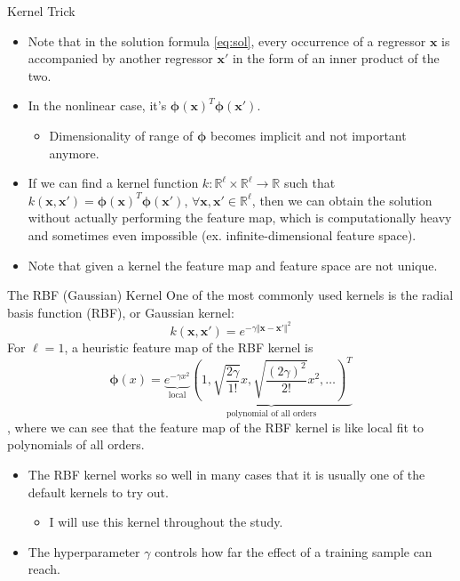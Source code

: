 \documentclass[aspectratio=169]{beamer}
\begin{document}
\begin{frame}{Kernel Trick}
\begin{itemize}
  \item Note that in the solution formula \ref{eq:sol}, every occurrence of a regressor $\mathbf{x}$ is accompanied by another regressor $\mathbf{x}'$ in the form of an inner product of the two.
  \item In the nonlinear case, it's $\bm{\phi}(\mathbf{x})^T\bm{\phi}(\mathbf{x}')$.
  \begin{itemize}
    \item Dimensionality of range of $\bm{\phi}$ becomes implicit and not important anymore.
  \end{itemize}
  \item If we can find a kernel function $k:\mathbb{R}^\ell\times\mathbb{R}^\ell\rightarrow\mathbb{R}$ such that $k(\mathbf{x},\mathbf{x}')=\bm{\phi}(\mathbf{x})^T\bm{\phi}(\mathbf{x}')$, $\forall\mathbf{x},\mathbf{x}'\in\mathbb{R}^\ell$, then we can obtain the solution without actually performing the feature map, which is computationally heavy and sometimes even impossible (ex. infinite-dimensional feature space).
  \item Note that given a kernel the feature map and feature space are not unique.
\end{itemize}
\end{frame}

\begin{frame}{The RBF (Gaussian) Kernel}
\footnotesize
One of the most commonly used kernels is the radial basis function (RBF), or Gaussian kernel:
\begin{equation}
  k(\mathbf{x},\mathbf{x}')=e^{-\gamma\Vert\mathbf{x}-\mathbf{x}'\Vert^2}
\end{equation}
For $\ell=1$, a heuristic feature map of the RBF kernel is
\begin{equation}
  \bm{\phi}(x)=\underbrace{e^{-\gamma x^2}}_\text{local}\underbrace{\left(1,\sqrt{\frac{2\gamma}{1!}}x,\sqrt{\frac{(2\gamma)^2}{2!}}x^2,\dots\right)^T}_\text{polynomial of all orders}
\end{equation}
, where we can see that the feature map of the RBF kernel is like local fit to polynomials of all orders.
\begin{itemize}
  \item The RBF kernel works so well in many cases that it is usually one of the default kernels to try out.
  \begin{itemize}
    \scriptsize
    \item I will use this kernel throughout the study.
  \end{itemize}
    \item The hyperparameter $\gamma$ controls how far the effect of a training sample can reach.
\end{itemize}
\end{frame}
\end{document}
